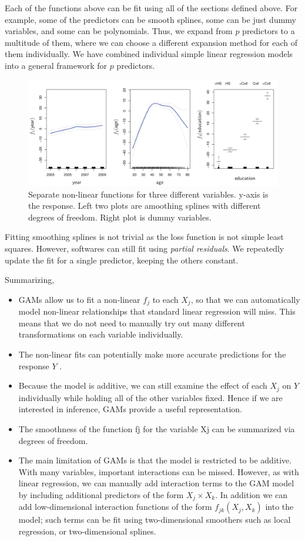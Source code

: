 \documentclass[11pt, a4paper]{article}
\begin{document}
    Each of the functions above can be fit using all of the sections defined above. For example, some of the predictors can be smooth splines, some can be just dummy variables, and some can be polynomials. Thus, we expand from $p$ predictors to a multitude of them, where we can choose a different expansion method for each of them individually. We have combined individual simple linear regression models into a general framework for $p$ predictors.

    \begin{figure}[h]
    \includegraphics[scale=0.6]{gam}
    \centering
    \caption{Separate non-linear functions for three different variables. y-axis is the response. Left two plots are amoothing splines with different degrees of freedom. Right plot is dummy variables.}
    \label{fig:gam} %
    \end{figure}

    Fitting smoothing splines is not trivial as the loss function is not simple least squares. However, softwares can still fit using \emph{partial residuals}. We repeatedly update the fit for a single predictor, keeping the others constant.

    Summarizing,
    \begin{itemize}
        \item GAMs allow us to fit a non-linear $f_{j}$ to each $X_{j}$, so that we can automatically model non-linear relationships that standard linear regression will miss. This means that we do not need to manually try out many different transformations on each variable individually.
        \item The non-linear fits can potentially make more accurate predictions for the response $Y$ .
        \item Because the model is additive, we can still examine the effect of each $X_{j}$ on $Y$ individually while holding all of the other variables fixed. Hence if we are interested in inference, GAMs provide a useful representation.
        \item The smoothness of the function fj for the variable Xj can be summarized via degrees of freedom.
        \item The main limitation of GAMs is that the model is restricted to be additive. With many variables, important interactions can be missed. However, as with linear regression, we can manually add interaction terms to the GAM model by including additional predictors of the form $X_{j} \times X_{k}$. In addition we can add low-dimensional interaction functions of the form $f_{jk}(X_{j}, X_{k})$ into the model; such terms can be fit using two-dimensional smoothers such as local regression, or two-dimensional splines.
    \end{itemize}
\end{document}
